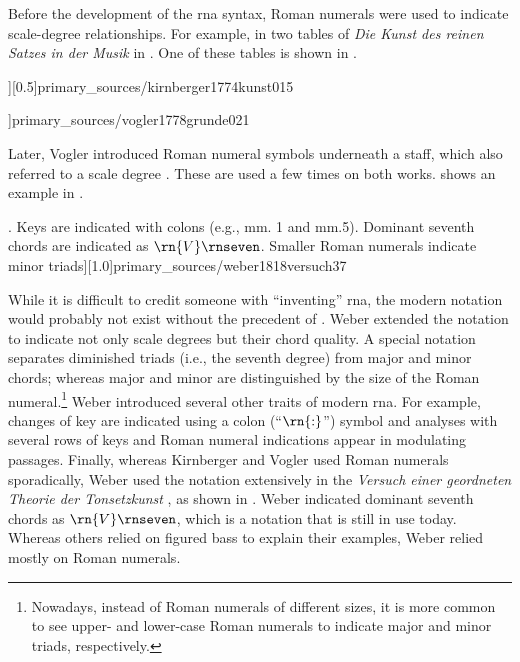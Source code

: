 
Before the development of the \gls{rna} syntax, Roman
numerals were used to indicate scale-degree relationships.
For example, in two tables of \emph{Die Kunst des reinen
Satzes in der Musik} in \textcite{kirnberger1774kunst}. One
of these tables is shown in
.

\phdfigure[Roman numerals in
\textcite[15]{kirnberger1774kunst}][0.5]{primary_sources/kirnberger1774kunst015}
 
\phdfigure[Roman numerals in
\textcite[Tab~XXI]{vogler1778grunde}]{primary_sources/vogler1778grunde021}

Later, Vogler introduced Roman numeral symbols underneath a
staff, which also referred to a scale degree
\parencite{vogler1778grunde, vogler1802handbuch}. These are
used a few times on both works.
 shows an
example in \textcite{vogler1778grunde}.

\phdfigure[Roman numerals in
\textcite[37]{weber1818versuch}. Keys are indicated with
colons (e.g., mm. 1 and mm.5). Dominant seventh chords are
indicated as $\rn{V}\rnseven$. Smaller Roman numerals
indicate minor
triads][1.0]{primary_sources/weber1818versuch37}

While it is difficult to credit someone with ``inventing''
\gls{rna}, the modern notation would probably not exist
without the precedent of \textcite{weber1818versuch}. Weber
extended the notation to indicate not only scale degrees but
their chord quality. A special notation separates diminished
triads (i.e., the seventh degree) from major and minor
chords; whereas major and minor are distinguished by the
size of the Roman numeral.\footnote{Nowadays, instead of
Roman numerals of different sizes, it is more common to see
upper- and lower-case Roman numerals to indicate major and
minor triads, respectively.} Weber introduced several other
traits of modern \gls{rna}. For example, changes of key are
indicated using a colon (``$\rn{:}$'') symbol and analyses
with several rows of keys and Roman numeral indications
appear in modulating passages. Finally, whereas Kirnberger
and Vogler used Roman numerals sporadically, Weber used the
notation extensively in the
\emph{Versuch einer geordneten Theorie der Tonsetzkunst}
\parencite{weber1818versuch}, as shown in
. Weber indicated
dominant seventh chords as $\rn{V}\rnseven$, which is a
notation that is still in use today. Whereas others relied
on figured bass to explain their examples, Weber relied
mostly on Roman numerals.
